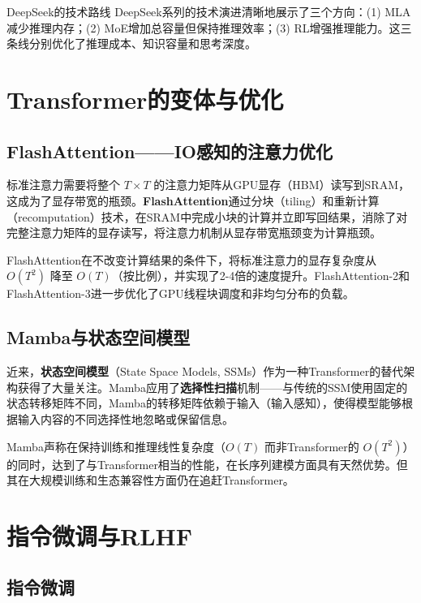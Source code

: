 \begin{myTheorem}{DeepSeek的技术路线}
DeepSeek系列的技术演进清晰地展示了三个方向：(1) MLA减少推理内存；(2) MoE增加总容量但保持推理效率；(3) RL增强推理能力。这三条线分别优化了推理成本、知识容量和思考深度。
\end{myTheorem}

\section{Transformer的变体与优化}

\subsection{FlashAttention——IO感知的注意力优化}

标准注意力需要将整个 $T \times T$ 的注意力矩阵从GPU显存（HBM）读写到SRAM，这成为了显存带宽的瓶颈。\textbf{FlashAttention}通过分块（tiling）和重新计算（recomputation）技术，在SRAM中完成小块的计算并立即写回结果，消除了对完整注意力矩阵的显存读写，将注意力机制从显存带宽瓶颈变为计算瓶颈。

FlashAttention在不改变计算结果的条件下，将标准注意力的显存复杂度从 $O(T^2)$ 降至 $O(T)$（按比例），并实现了2-4倍的速度提升。FlashAttention-2和FlashAttention-3进一步优化了GPU线程块调度和非均匀分布的负载。

\subsection{Mamba与状态空间模型}

近来，\textbf{状态空间模型}（State Space Models, SSMs）作为一种Transformer的替代架构获得了大量关注。Mamba应用了\textbf{选择性扫描}机制——与传统的SSM使用固定的状态转移矩阵不同，Mamba的转移矩阵依赖于输入（输入感知），使得模型能够根据输入内容的不同选择性地忽略或保留信息。

Mamba声称在保持训练和推理线性复杂度（$O(T)$ 而非Transformer的 $O(T^2)$）的同时，达到了与Transformer相当的性能，在长序列建模方面具有天然优势。但其在大规模训练和生态兼容性方面仍在追赶Transformer。

\section{指令微调与RLHF}

\subsection{指令微调}

